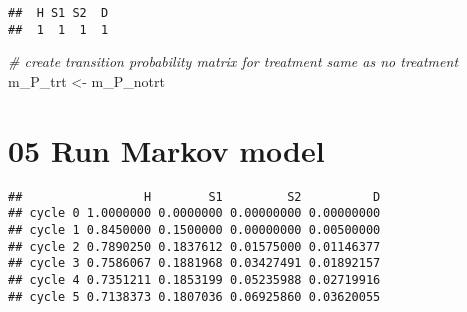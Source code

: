 \documentclass[
]{article}
\newenvironment{Shaded}{\begin{snugshade}}{\end{snugshade}}
\newcommand{\CommentTok}[1]{\textcolor[rgb]{0.56,0.35,0.01}{\textit{#1}}}
\newcommand{\ControlFlowTok}[1]{\textcolor[rgb]{0.13,0.29,0.53}{\textbf{#1}}}
\newcommand{\DecValTok}[1]{\textcolor[rgb]{0.00,0.00,0.81}{#1}}
\newcommand{\KeywordTok}[1]{\textcolor[rgb]{0.13,0.29,0.53}{\textbf{#1}}}
\newcommand{\NormalTok}[1]{#1}
\newcommand{\OperatorTok}[1]{\textcolor[rgb]{0.81,0.36,0.00}{\textbf{#1}}}
\newcommand{\StringTok}[1]{\textcolor[rgb]{0.31,0.60,0.02}{#1}}
\begin{document}
\begin{verbatim}
##  H S1 S2  D 
##  1  1  1  1
\end{verbatim}

\begin{Shaded}
\begin{Highlighting}[]
\CommentTok{# create transition probability matrix for treatment same as no treatment}
\NormalTok{m_P_trt <-}\StringTok{ }\NormalTok{m_P_notrt}
\end{Highlighting}
\end{Shaded}

\hypertarget{run-markov-model}{%
\section{05 Run Markov model}\label{run-markov-model}}

\begin{Shaded}
\end{Shaded}

\begin{verbatim}
##                 H        S1         S2          D
## cycle 0 1.0000000 0.0000000 0.00000000 0.00000000
## cycle 1 0.8450000 0.1500000 0.00000000 0.00500000
## cycle 2 0.7890250 0.1837612 0.01575000 0.01146377
## cycle 3 0.7586067 0.1881968 0.03427491 0.01892157
## cycle 4 0.7351211 0.1853199 0.05235988 0.02719916
## cycle 5 0.7138373 0.1807036 0.06925860 0.03620055
\end{verbatim}
\end{document}
